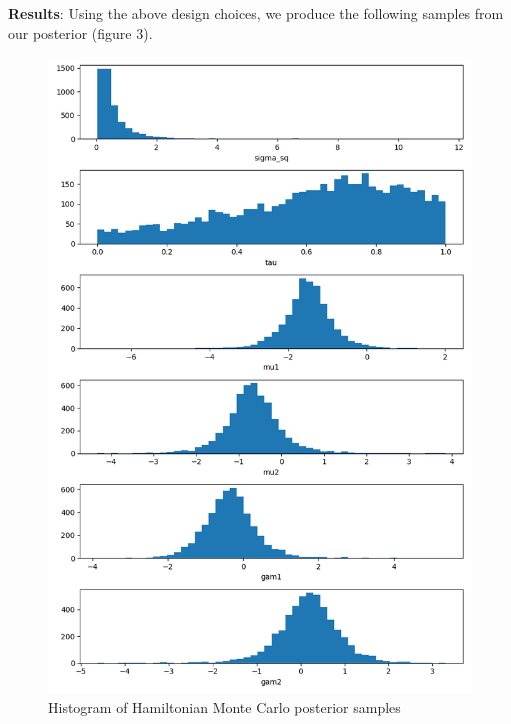 \documentclass[12pt,letterpaper,twoside]{article}
\begin{document}
\textbf{Results}: Using the above design choices, we produce the following 
samples from our posterior (figure 3).
\begin{figure}[H]
    \centering
    \includegraphics[scale=0.7]{hmc_sampled_histogram.png}
    \caption{Histogram of Hamiltonian Monte Carlo posterior samples}
\end{figure}
\end{document}
